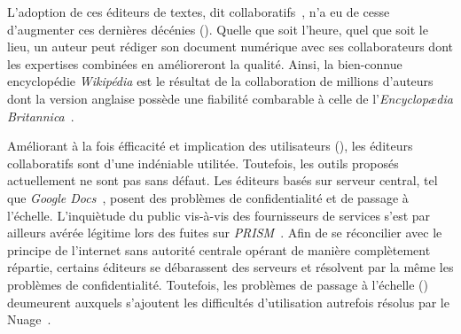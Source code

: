 L'adoption de ces éditeurs de textes, dit
collaboratifs~\cite{ellis1991groupware}, n'a eu de cesse d'augmenter ces
dernières décénies (\REF). Quelle que soit l'heure, quel que soit le lieu, un
auteur peut rédiger son document numérique avec ses collaborateurs dont les
expertises combinées en amélioreront la qualité. Ainsi, la bien-connue
encyclopédie \emph{Wikipédia} est le résultat de la collaboration de millions
d'auteurs dont la version anglaise possède une fiabilité combarable à celle de
l'\emph{Encyclop\ae{}dia Britannica}~\cite{giles2005internet}.

Améliorant à la fois éfficacité et implication des utilisateurs (\REF), les
éditeurs collaboratifs sont d'une indéniable utilitée. Toutefois, les outils
proposés actuellement ne sont pas sans défaut. Les éditeurs basés sur serveur
central, tel que \emph{Google Docs}~\cite{nichols1995high}, posent des problèmes
de confidentialité et de passage à l'échelle. L'inquiètude du public vis-à-vis
des fournisseurs de services s'est par ailleurs avérée légitime lors des fuites
sur \emph{PRISM}~\cite{gellman2013us}. Afin de se réconcilier avec le principe de
l'internet sans autorité centrale opérant de manière complètement répartie,
certains éditeurs se débarassent des serveurs et résolvent par la même les
problèmes de confidentialité. Toutefois, les problèmes de passage à l'échelle
(\REF) deumeurent auxquels s'ajoutent les difficultés d'utilisation autrefois
résolus par le Nuage~\cite{mell2011national}.



